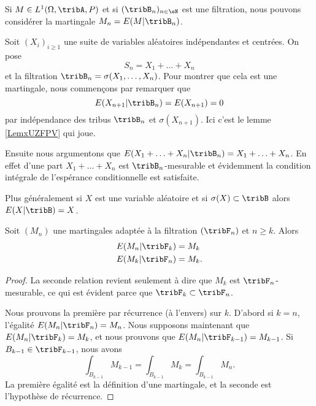 \begin{example}
    Si \( M\in L^1(\Omega,\tribA,P)\) et si \( (\tribB_n)_{n\in \eN}\) est une filtration, nous pouvons considérer la martingale \( M_n=E(M|\tribB_n)\).
\end{example}

\begin{example}     \label{ExtFFKTr}
    Soit \( (X_i)_{i\geq 1}\) une suite de variables aléatoires indépendantes et centrées. On pose
    \begin{equation}
        S_n=X_1+\ldots +X_n
    \end{equation}
    et la filtration \( \tribB_n=\sigma(X_1,\ldots, X_n)\). Pour montrer que cela est une martingale, nous commençons par remarquer que
    \begin{equation}
        E(X_{n+1}|\tribB_n)=E(X_{n+1})=0
    \end{equation}
    par indépendance des tribus \( \tribB_n\) et \( \sigma(X_{n+1})\). Ici c'est le lemme \ref{LemxUZFPV} qui joue.

    Ensuite nous argumentons que \( E(X_1+\ldots +X_n|\tribB_n)=X_1+\ldots +X_n\). En effet d'une part \( X_1+\ldots +X_n\) est \( \tribB_n\)-mesurable et évidemment la condition intégrale de l'espérance conditionnelle est satisfaite.

    Plus généralement si \( X\) est une variable aléatoire et si \( \sigma(X)\subset\tribB\) alors \( E(X|\tribB)=X\).
\end{example}

\begin{lemma}   \label{LemqanhgJ}
    Soit \( (M_n)\) une martingales adaptée à la filtration \( (\tribF_n)\) et \( n\geq k\). Alors
    \begin{subequations}
        \begin{align}
            E(M_n|\tribF_k)&=M_k\\
            E(M_k|\tribF_n)&=M_k.
        \end{align}
    \end{subequations}
\end{lemma}

\begin{proof}
    La seconde relation revient seulement à dire que \( M_k\) est \( \tribF_n\)-mesurable, ce qui est évident parce que \( \tribF_k\subset\tribF_n\).

    Nous prouvons la première par récurrence (à l'envers) sur \( k\). D'abord si \( k=n\), l'égalité \( E(M_n|\tribF_n)=M_n\). Nous supposons maintenant que \( E(M_n|\tribF_k)=M_k\), et nous prouvons que \( E(M_n|\tribF_{k-1})=M_{k-1}\). Si \( B_{k-1}\in \tribF_{k-1}\), nous avons
    \begin{equation}
        \int_{B_{k-1}}M_{k-1}=\int_{B_{k-1}}M_{k}=\int_{B_{k-1}}M_n.
    \end{equation}
    La première égalité est la définition d'une martingale, et la seconde est l'hypothèse de récurrence.
\end{proof}

